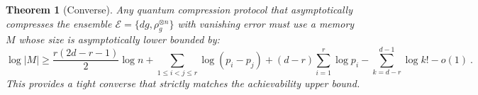 \documentclass[11pt,letterpaper]{article}
\newtheorem{thm}{Theorem}
\def\O{\mathcal{O}}
\def\E{\mathcal{E}}
\begin{document}

\begin{thm}[Converse]
    Any quantum compression protocol that asymptotically compresses the ensemble $\mathcal{E} = \{dg, \rho_g^{\otimes n}\}$ with vanishing error must use a memory $M$ whose size is asymptotically lower bounded by:
    \begin{equation}
        \log|M| \ge \frac{r(2d-r-1)}{2}\log n + \sum_{1 \le i < j \le r}\log(p_i-p_j) + (d-r)\sum_{i=1}^r \log p_i - \sum_{k=d-r}^{d-1}\log k! - o(1) \ .
    \end{equation}
    This provides a tight converse that strictly matches the achievability upper bound.
\end{thm}
\end{document}
